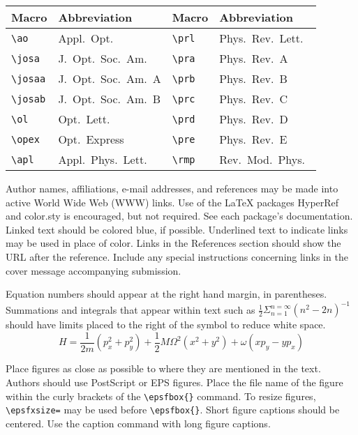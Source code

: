 \begin{table}
\begin{center}
\begin{tabular}{lp{1.7in}|lp{1.7in}}\hline 
Macro & Abbreviation & Macro & Abbreviation \\ \hline 
\verb+\ao+ & Appl.\  Opt.\  &
   \verb+\prl+ & Phys.\ Rev.\ Lett.\ \\
\verb+\josa+ & J.\ Opt.\ Soc.\ Am.\  &
   \verb+\pra+ & Phys.\ Rev.\ A   \\
\verb+\josaa+ & J.\ Opt.\ Soc.\ Am.\ A  &
   \verb+\prb+ & Phys.\ Rev.\ B   \\
\verb+\josab+ & J.\ Opt.\ Soc.\ Am.\ B &
   \verb+\prc+ & Phys.\ Rev.\ C   \\
\verb+\ol+ & Opt.\ Lett.\   &
   \verb+\prd+ & Phys.\ Rev.\ D   \\
\verb+\opex+ & Opt.\ Express   &
    \verb+\pre+ & Phys.\ Rev.\ E     \\   
\verb+\apl+ & Appl.\ Phys.\ Lett.\  &
    \verb+\rmp+ & Rev.\ Mod.\ Phys.\  \\
 \hline
\end{tabular}
\end{center}
\end{table}


Author names, affiliations, e-mail addresses, and 
references may be made into active World Wide Web (WWW)
links. Use of the LaTeX packages HyperRef and 
color.sty is encouraged, but not required.  See each
package's documentation.  Linked text should be colored
blue, if possible.  Underlined text to indicate links
may be used in place of color.  Links in the References
section should show the URL after the reference. 
Include any special instructions concerning links in the 
cover message accompanying submission.

Equation numbers should 
appear at the right hand margin, in parentheses. 
Summations and integrals that appear 
within text such as  $\frac{1}{2}{\Sigma } 
 _{n=1}^{n=\infty} (n^2 - 2n)^{-1}$ 
should have limits placed to the 
right of the symbol to reduce white space.
\begin{equation}
H = \frac{1}{2m}(p_x^2 + p_y^2) + \frac{1}{2} M{\Omega}^2
     (x^2 + y^2) + \omega (xp_y - yp_x)
\end{equation}

Place figures as close as 
possible to where they are mentioned in the text. 
Authors should use PostScript or EPS figures. Place 
the file name of the figure within the 
curly brackets of the 
\verb+\epsfbox{}+ command. To resize figures, 
\verb+\epsfxsize=+  may be used before \verb+\epsfbox{}+.
Short figure captions should be centered.
Use the caption command with long figure captions.

